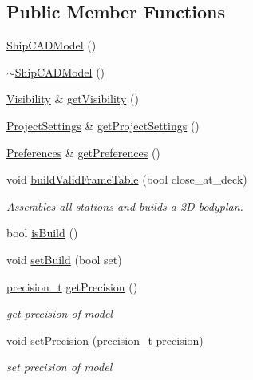 \subsection*{Public Member Functions}
\begin{DoxyCompactItemize}
\item 
\hyperlink{classShipCAD_1_1ShipCADModel_abede72e53058c2ecf8dc2c4b2a7c8014}{Ship\-C\-A\-D\-Model} ()
\item 
\hyperlink{classShipCAD_1_1ShipCADModel_a69faa69f492a5aad941990319e5e88c0}{$\sim$\-Ship\-C\-A\-D\-Model} ()
\item 
\hyperlink{classShipCAD_1_1Visibility}{Visibility} \& \hyperlink{classShipCAD_1_1ShipCADModel_a50cca4c783baeba58c8068c9b8a5d6a4}{get\-Visibility} ()
\item 
\hyperlink{classShipCAD_1_1ProjectSettings}{Project\-Settings} \& \hyperlink{classShipCAD_1_1ShipCADModel_a94a8eed8ac8ff4ad8287a0a1113e3271}{get\-Project\-Settings} ()
\item 
\hyperlink{classShipCAD_1_1Preferences}{Preferences} \& \hyperlink{classShipCAD_1_1ShipCADModel_aa6af8872deba5b401ac575a85901a265}{get\-Preferences} ()
\item 
void \hyperlink{classShipCAD_1_1ShipCADModel_abefac47aa19318b4ae3c82108dfe4585}{build\-Valid\-Frame\-Table} (bool close\-\_\-at\-\_\-deck)
\begin{DoxyCompactList}\small\item\em Assembles all stations and builds a 2\-D bodyplan. \end{DoxyCompactList}\item 
bool \hyperlink{classShipCAD_1_1ShipCADModel_a0c7a15b80b5013066fd77f46e57850ef}{is\-Build} ()
\item 
void \hyperlink{classShipCAD_1_1ShipCADModel_ab221977f2a8bd4d51d6ee777be0d7b8a}{set\-Build} (bool set)
\item 
\hyperlink{namespaceShipCAD_ae13c7e36dfb1e2300741a631041cd915}{precision\-\_\-t} \hyperlink{classShipCAD_1_1ShipCADModel_a949318726227fe0ba274b34d2ea4528a}{get\-Precision} ()
\begin{DoxyCompactList}\small\item\em get precision of model \end{DoxyCompactList}\item 
void \hyperlink{classShipCAD_1_1ShipCADModel_a6133fe12cd13b6ce24424e19a8b1e433}{set\-Precision} (\hyperlink{namespaceShipCAD_ae13c7e36dfb1e2300741a631041cd915}{precision\-\_\-t} precision)
\begin{DoxyCompactList}\small\item\em set precision of model \end{DoxyCompactList}\item 

\end{DoxyCompactItemize}
